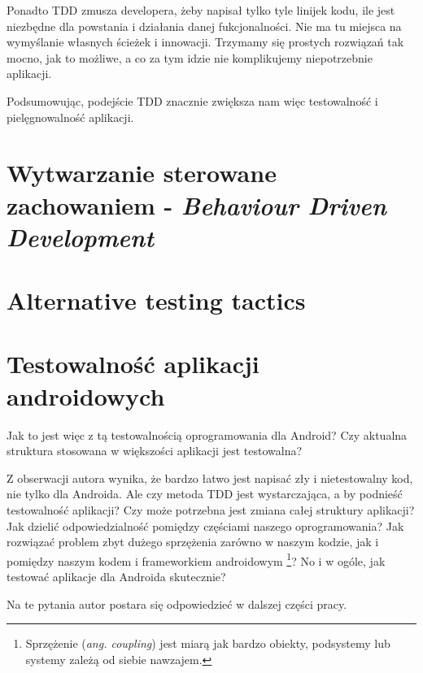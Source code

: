 Ponadto TDD zmusza developera, żeby napisał tylko tyle linijek kodu, ile jest niezbędne dla powstania i działania danej fukcjonalności. Nie ma tu miejsca na wymyślanie własnych ścieżek i innowacji. Trzymamy się prostych rozwiązań tak mocno, jak to możliwe, a co za tym idzie nie komplikujemy niepotrzebnie aplikacji.

Podsumowując, podejście TDD znacznie zwiększa nam więc testowalność i pielęgnowalność aplikacji. 

\section{Wytwarzanie sterowane zachowaniem - \textit{Behaviour Driven Development}}
\label{behaviour_driven_development}


\section{Alternative testing tactics}

\section{Testowalność aplikacji androidowych}
Jak to jest więc z tą testowalnością oprogramowania dla Android? Czy aktualna struktura stosowana w większości aplikacji jest testowalna?

Z obserwacji autora wynika, że bardzo łatwo jest napisać zły i nietestowalny kod, nie tylko dla Androida. Ale czy metoda TDD jest wystarczająca, a by podnieść testowalność aplikacji? Czy może potrzebna jest zmiana całej struktury aplikacji? Jak dzielić odpowiedzialność pomiędzy częściami naszego oprogramowania? Jak rozwiązać problem zbyt dużego sprzężenia zarówno w naszym kodzie, jak i pomiędzy naszym kodem i frameworkiem androidowym \footnote{Sprzężenie (\textit{ang. coupling}) jest miarą jak bardzo obiekty, podsystemy lub systemy zależą od siebie nawzajem.}? No i w ogóle, jak testować aplikacje dla Androida skutecznie?

Na te pytania autor postara się odpowiedzieć w dalszej części pracy.



